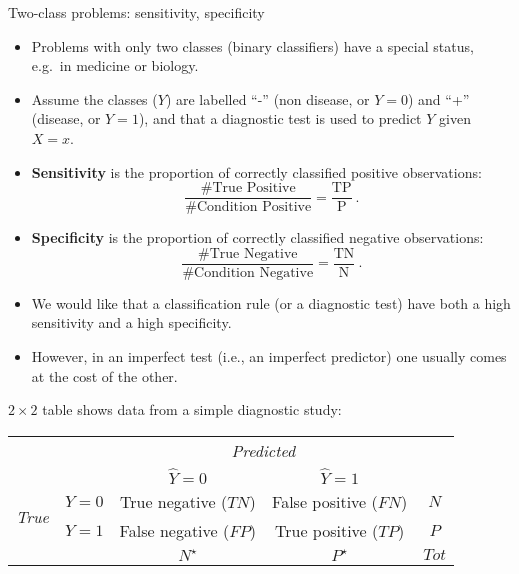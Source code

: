 \documentclass[10pt,ignorenonframetext,]{beamer}
\providecommand{\tightlist}{%
  \setlength{\itemsep}{0pt}\setlength{\parskip}{0pt}}
\begin{document}
\begin{frame}{Two-class problems: sensitivity, specificity}
\protect\hypertarget{two-class-problems-sensitivity-specificity}{}

\begin{itemize}
\item
  Problems with only two classes (binary classifiers) have a special
  status, e.g.~in medicine or biology.
\item
  Assume the classes (\(Y\)) are labelled ``-'' (non disease, or
  \(Y=0\)) and ``+'' (disease, or \(Y=1\)), and that a diagnostic test
  is used to predict \(Y\) given \(X=x\).
\item
  \textbf{Sensitivity} is the proportion of correctly classified
  positive observations:
  \[\frac{\# \text{True Positive}}{\# \text{Condition Positive}}=\frac{\text{TP}}{\text{P}} \ .\]
\item
  \textbf{Specificity} is the proportion of correctly classified
  negative observations:
  \[\frac{\# \text{True Negative}}{\# \text{Condition Negative}}=\frac{\text{TN}}{\text{N}} \ .\]
\end{itemize}

\end{frame}

\begin{frame}

\begin{itemize}
\tightlist
\item
  We would like that a classification rule (or a diagnostic test) have
  both a high sensitivity and a high specificity.
\end{itemize}

\vspace{2mm}

\begin{itemize}
\tightlist
\item
  However, in an imperfect test (i.e., an imperfect predictor) one
  usually comes at the cost of the other.
\end{itemize}

\vspace{2mm}

\(2 \times 2\) table shows data from a simple diagnostic study:

\begin{center}
\begin{tabular}{ll|cc|c}
& & \multicolumn{2}{c}{\emph{Predicted}} \\
& & $\hat{Y}=0$ & $\hat{Y}=1$ \\ 
\hline
\multirow{2}{*}{\emph{True}} & $Y=0$ & True negative ($TN$) & False positive ($FN$) & $N$\\
 & $Y=1$ & False negative ($FP$) & True positive ($TP$) & $P$\\
\hline
& & $N^\star$ & $P^\star$ & $Tot$ 
\end{tabular}
\end{center}

\end{frame}
\end{document}
